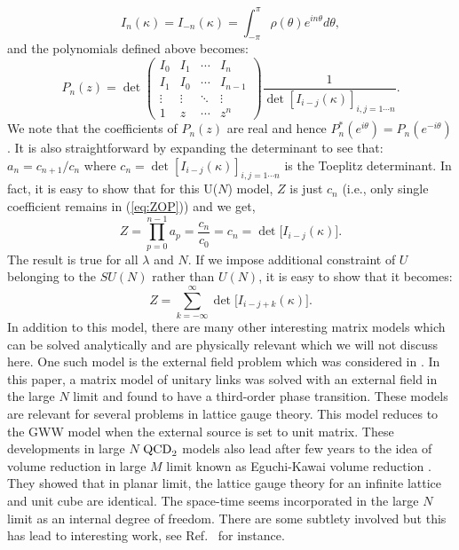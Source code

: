 \documentclass[11pt]{article}
\begin{document}
\begin{equation}
	I_{n}(\kappa) = I_{-n}(\kappa) = \int_{-\pi}^{\pi} \rho(\theta) e^{i n \theta}d\theta, 
\end{equation}
and the polynomials defined above becomes:
\begin{equation}
	P_{n}(z) = \det
	\begin{pmatrix}
		I_0 & I_1 & \cdots & I_n \\
		I_1 & I_0 & \cdots & I_{n-1} \\
		\vdots  & \vdots  & \ddots & \vdots  \\
		1 & z & \cdots & z^n 
			\end{pmatrix}
		 \frac{1}{\det [I_{i-j} (\kappa)]_{i,j = 1 \cdots n}}. 
\end{equation}
We note that the coefficients of $P_{n}(z)$ are real and hence $P_{n}^{*}(e^{i\theta}) = P_{n}(e^{-i\theta})$. It is also straightforward by expanding the determinant to see that: $a_{n} = c_{n+1}/c_{n}$ where $c_{n} = \det [I_{i-j}(\kappa)]_{i,j = 1 \cdots n}$ is the Toeplitz determinant. 
In fact, it is easy to show that for this U($N$) model, $Z$ is just $c_{n}$ (i.e., only single coefficient remains in (\ref{eq:ZOP})) and we get, 
\begin{equation}
\label{eq:GWW_ex} 
Z = \prod_{p=0}^{n-1} a_{p} = \frac{c_n}{c_0} = c_{n} = \det \Big[I_{i-j}(\kappa) \Big].
\end{equation}
The result is true for all $\lambda$ and $N$. If we impose additional constraint of 
$U$ belonging to the $SU(N)$ rather than $U(N)$, it is easy to show that
it becomes:
\begin{equation}
\label{eq:GWW_ex} 
Z = \sum_{k=-\infty}^{\infty} \det \Big[I_{i-j+k}(\kappa) \Big].
\end{equation}
In addition to this model, there are many other interesting matrix models which can be solved analytically
and are physically relevant which we will not discuss here. 
One such model is the external field problem which was considered in \cite{Brezin:1980rk}. In this paper, a matrix 
model of unitary links was solved with an external field in the large $N$ limit and found to have a third-order phase transition. These models are relevant for several problems in lattice gauge theory. This model reduces to the GWW model when the external source is set to unit matrix. These developments in large $N$ $\rm{QCD}_{2}$ models also lead after few years to the idea of volume reduction in large $M$ limit known as Eguchi-Kawai volume reduction \cite{Eguchi:1982nm}. They showed that in planar limit, the lattice gauge theory for an infinite lattice and unit cube are identical. The space-time seems incorporated in the large $N$ limit as an internal degree of freedom. There are some subtlety involved but this has lead to interesting work, see Ref.~\cite{Kovtun:2007py} for instance. 
\end{document}
